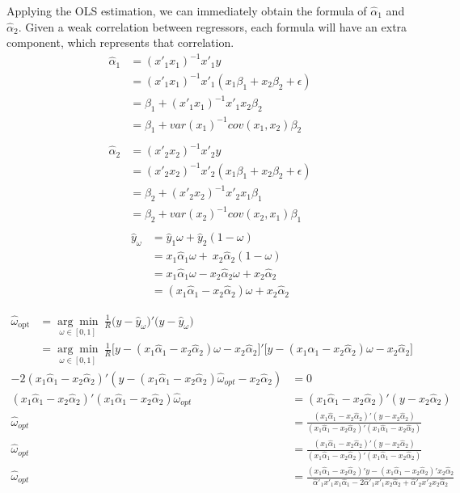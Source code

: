 \documentclass{monashthesis}
\begin{document}
Applying the OLS estimation, we can immediately obtain the formula of \(\hat\alpha_{1}\) and \(\hat\alpha_{2}\). Given a weak correlation between regressors, each formula will have an extra component, which represents that correlation.
\begin{align*}
    \hat\alpha_{1} &= (x'_1x_1)^{-1} x'_1y \\
    &= (x'_1x_1)^{-1} x'_1(x_1 \beta_1 + x_2 \beta_2 + \epsilon) \\
    &= \beta_1 + (x'_1x_1)^{-1} x'_1x_2 \beta_2 \\
    &= \beta_1 + var(x_1)^{-1} cov(x_1,x_2) \beta_2 \\
    \\
    \hat\alpha_{2} &= (x'_2x_2)^{-1} x'_2y \\
    &= (x'_2x_2)^{-1} x'_2(x_1 \beta_1 + x_2 \beta_2 + \epsilon) \\
    &= \beta_2 + (x'_2x_2)^{-1} x'_2x_1 \beta_1 \\
    &= \beta_2 + var(x_2)^{-1} cov(x_2,x_1) \beta_1 \\
\end{align*}
\begin{align*}
    \hat y_{\omega} &= \hat y_1 \omega + \hat y_2 (1-\omega) \\
    &= x_1 \hat\alpha_1 \omega + \ x_2 \hat\alpha_2 (1-\omega) \\
    &= x_1 \hat\alpha_1 \omega - x_2 \hat\alpha_2 \omega + x_2 \hat\alpha_2 \\
    &= (x_1 \hat\alpha_1 - x_2 \hat\alpha_2) \omega + x_2 \hat\alpha_2 
\end{align*}

\begin{align*}
\hat{\omega}_{\text{opt}} 
&= \underset{\omega \in [0,1]}{\arg\min} \ \frac{1}{R} \big(y - \hat y_{\omega}\big)' \big(y - \hat y_{\omega}\big) \\
&= \underset{\omega \in [0,1]}{\arg\min} \ \frac{1}{R} \big[y-(x_1 \hat\alpha_1 - x_2 \hat\alpha_2) \omega - x_2 \hat\alpha_2\big]'\big[y-(x_1 \hat\alpha_1 - x_2 \hat\alpha_2) \omega - x_2 \hat\alpha_2\big]
\end{align*}
\begin{align*}
    -2(x_1 \hat\alpha_1 - x_2 \hat\alpha_2)' (y-(x_1 \hat\alpha_1 - x_2 \hat\alpha_2) \hat\omega_{opt} - x_2 \hat\alpha_2) &= 0 \\
    (x_1 \hat\alpha_1 - x_2 \hat\alpha_2)' (x_1 \hat\alpha_1 - x_2 \hat\alpha_2) \hat\omega_{opt} &= (x_1 \hat\alpha_1 - x_2 \hat\alpha_2)' (y - x_2 \hat\alpha_2) \\
    \hat\omega_{opt} &= \frac{(x_1 \hat\alpha_1 - x_2 \hat\alpha_2)' (y - x_2 \hat\alpha_2)}{(x_1 \hat\alpha_1 - x_2 \hat\alpha_2)' (x_1 \hat\alpha_1 - x_2 \hat\alpha_2)} \\
    \hat\omega_{opt} &= \frac{(x_1 \hat\alpha_1 - x_2 \hat\alpha_2)' (y - x_2 \hat\alpha_2)}{(x_1 \hat\alpha_1 - x_2 \hat\alpha_2)' (x_1 \hat\alpha_1 - x_2 \hat\alpha_2)} \\
    \hat\omega_{opt} &= \frac{(x_1 \hat\alpha_1 - x_2 \hat\alpha_2)' y - (x_1 \hat\alpha_1 - x_2 \hat\alpha_2)' x_2 \hat\alpha_2}{\hat\alpha'_1 x'_1 x_1 \hat\alpha_1 - 2\hat\alpha'_1 x'_1 x_2 \hat\alpha_2 + \hat\alpha'_2 x'_2 x_2 \hat\alpha_2}
\end{align*}
\end{document}
